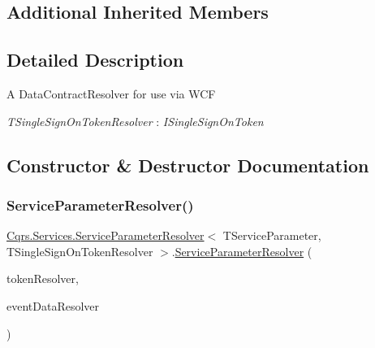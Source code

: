 \subsection*{Additional Inherited Members}


\subsection{Detailed Description}
A Data\+Contract\+Resolver for use via W\+CF 

\begin{Desc}
\item[Type Constraints]\begin{description}
\item[{\em T\+Single\+Sign\+On\+Token\+Resolver} : {\em I\+Single\+Sign\+On\+Token}]\end{description}
\end{Desc}


\subsection{Constructor \& Destructor Documentation}
\mbox{\label{classCqrs_1_1Services_1_1ServiceParameterResolver_ad7afabf942df245316a2b27d31ee30bd_ad7afabf942df245316a2b27d31ee30bd}} 
\subsubsection{\texorpdfstring{Service\+Parameter\+Resolver()}{ServiceParameterResolver()}}
{\footnotesize\ttfamily \hyperlink{classCqrs_1_1Services_1_1ServiceParameterResolver}{Cqrs.\+Services.\+Service\+Parameter\+Resolver}$<$ T\+Service\+Parameter, T\+Single\+Sign\+On\+Token\+Resolver $>$.\hyperlink{classCqrs_1_1Services_1_1ServiceParameterResolver}{Service\+Parameter\+Resolver} (\begin{DoxyParamCaption}\item[{\hyperlink{interfaceCqrs_1_1Services_1_1ISingleSignOnTokenResolver}{I\+Single\+Sign\+On\+Token\+Resolver}}]{token\+Resolver,  }\item[{\hyperlink{interfaceCqrs_1_1Services_1_1IEventDataResolver}{I\+Event\+Data\+Resolver}}]{event\+Data\+Resolver }\end{DoxyParamCaption})\hspace{0.3cm}{\ttfamily [protected]}}



